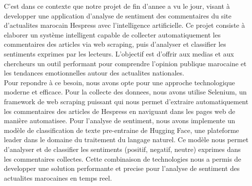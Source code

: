 C'est dans ce contexte que notre projet de fin d'annee a vu le jour, visant à developper une application d'analyse de sentiment des commentaires du site d'actualites marocain Hespress avec l'intelligence artificielle. Ce projet consiste à elaborer un système intelligent capable de collecter automatiquement les commentaires des articles via web scraping, puis d'analyser et classifier les sentiments exprimes par les lecteurs. L'objectif est d'offrir aux medias et aux chercheurs un outil performant pour comprendre l'opinion publique marocaine et les tendances emotionnelles autour des actualites nationales.
\\

Pour repondre à ce besoin, nous avons opte pour une approche technologique moderne et efficace. Pour la collecte des donnees, nous avons utilise Selenium, un framework de web scraping puissant qui nous permet d'extraire automatiquement les commentaires des articles de Hespress en naviguant dans les pages web de manière automatisee. Pour l'analyse de sentiment, nous avons implemente un modèle de classification de texte pre-entraine de Hugging Face, une plateforme leader dans le domaine du traitement du langage naturel. Ce modèle nous permet d'analyser et de classifier les sentiments (positif, negatif, neutre) exprimes dans les commentaires collectes. Cette combinaison de technologies nous a permis de developper une solution performante et precise pour l'analyse de sentiment des actualites marocaines en temps reel.
